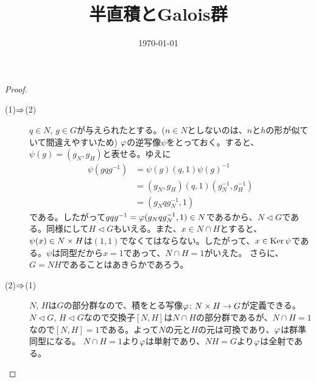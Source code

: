 \documentclass[10pt]{jsarticle}%
\begin{document}
\title{半直積とGalois群}
\author{}
\date{\today}
\maketitle


\begin{proof} ${}$
  \begin{description}
    \item[(1)$\Rightarrow$(2)] $q \in N$, $g \in G$が与えられたとする。($n \in N$としないのは、$n$と$h$の形が似ていて間違えやすいため) ${\varphi}$の逆写像$\psi$をとっておく。すると、$\psi(g) = (g_N, g_H)$と表せる。ゆえに
    \begin{align*}
      \psi(gqg^{-1}) &= \psi(g) (q,1) \psi(g)^{-1} \\
      &= (g_N,g_H) (q,1) (g_N^{-1}, g_H^{-1}) \\
      &= ( g_N q g_N^{-1} , 1)
    \end{align*}
    である。したがって$gqg^{-1} = {\varphi}(g_N q g_N^{-1} , 1) \in N$であるから、$N \lhd G$である。同様にして$H \lhd G$もいえる。また、$x \in N \cap H$とすると、$\psi(x) \in N \times H$は$(1,1)$でなくてはならない。したがって、$x \in \operatorname{Ker} \psi$である。$\psi$は同型だから$x=1$であって、$N \cap H =1$がいえた。
    さらに、$G = NH$であることはあきらかであろう。
    \item[(2)$\Rightarrow$(1)] $N$, $H$は$G$の部分群なので、積をとる写像${\varphi} \colon N \times H \to G$が定義できる。$N \lhd G$, $H \lhd G$なので交換子$[N,H]$は$N \cap H$の部分群であるが、$N \cap H = 1$なので$[N,H] = 1$である。よって$N$の元と$H$の元は可換であり、${\varphi}$は群準同型になる。
    $N \cap H = 1$より${\varphi}$は単射であり、$NH=G$より${\varphi}$は全射である。
  \end{description}
\end{proof}
\end{document}
